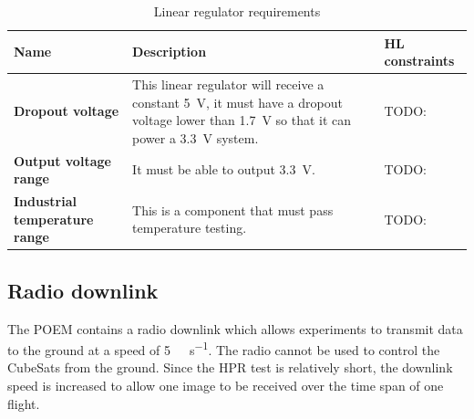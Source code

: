 \documentclass[]{report}
\begin{document}
\begin{table}[H]
  \centering
  \begin{tabular}{|L{0.2\textwidth}|L{0.495\textwidth}|L{0.2\textwidth}|}
    \hline
    \textbf{Name}                         & \textbf{Description}                                                                                                                                                  & \textbf{HL constraints} \\ \hline
    \textbf{Dropout voltage}              & This linear regulator will receive a constant \SI{5}{\volt}, it must have a dropout voltage lower than \SI{1.7}{\volt} so that it can power a \SI{3.3}{\volt} system. & TODO:                   \\\hline
    \textbf{Output voltage range}         & It must be able to output \SI{3.3}{\volt}.                                                                                                                            & TODO:                   \\\hline
    \textbf{Industrial temperature range} & This is a component that must pass temperature testing.                                                                                                               & TODO:                   \\\hline
  \end{tabular}
  \caption{Linear regulator requirements}
  \label{tabl:ldo-requirements}
\end{table}


\subsection{Radio downlink}

The POEM contains a radio downlink which allows experiments to transmit data to the ground at a speed of \SI{5}{\kilo\bit\per\second}. The radio cannot be used to control the CubeSats from the ground. Since the HPR test is relatively short, the downlink speed is increased to allow one image to be received over the time span of one flight.
\end{document}
